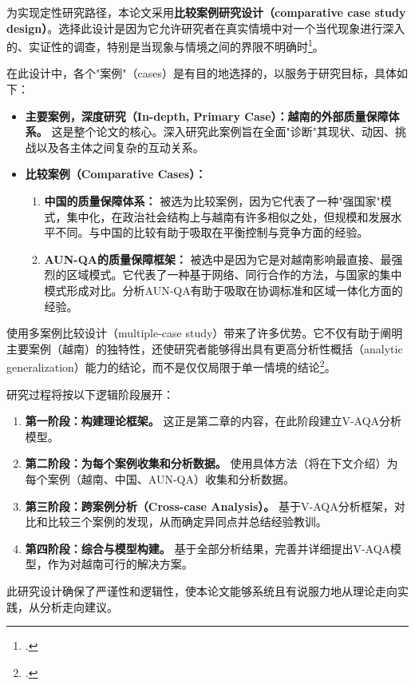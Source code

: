 为实现定性研究路径，本论文采用\textbf{比较案例研究设计（comparative case study design）}。选择此设计是因为它允许研究者在真实情境中对一个当代现象进行深入的、实证性的调查，特别是当现象与情境之间的界限不明确时\footcite{Yin2018}。

在此设计中，各个"案例"（cases）是有目的地选择的，以服务于研究目标，具体如下：
\begin{itemize}
    \item \textbf{主要案例，深度研究（In-depth, Primary Case）：越南的外部质量保障体系。} 这是整个论文的核心。深入研究此案例旨在全面"诊断"其现状、动因、挑战以及各主体之间复杂的互动关系。
    
    \item \textbf{比较案例（Comparative Cases）：}
    \begin{enumerate}
        \item \textbf{中国的质量保障体系：} 被选为比较案例，因为它代表了一种"强国家"模式，集中化，在政治社会结构上与越南有许多相似之处，但规模和发展水平不同。与中国的比较有助于吸取在平衡控制与竞争方面的经验。
        \item \textbf{AUN-QA的质量保障框架：} 被选中是因为它是对越南影响最直接、最强烈的区域模式。它代表了一种基于网络、同行合作的方法，与国家的集中模式形成对比。分析AUN-QA有助于吸取在协调标准和区域一体化方面的经验。
    \end{enumerate}
\end{itemize}

使用多案例比较设计（multiple-case study）带来了许多优势。它不仅有助于阐明主要案例（越南）的独特性，还使研究者能够得出具有更高分析性概括（analytic generalization）能力的结论，而不是仅仅局限于单一情境的结论\footcite{Yin2018}。

研究过程将按以下逻辑阶段展开：
\begin{enumerate}
    \item \textbf{第一阶段：构建理论框架。} 这正是第二章的内容，在此阶段建立V-AQA分析模型。
    \item \textbf{第二阶段：为每个案例收集和分析数据。} 使用具体方法（将在下文介绍）为每个案例（越南、中国、AUN-QA）收集和分析数据。
    \item \textbf{第三阶段：跨案例分析（Cross-case Analysis）。} 基于V-AQA分析框架，对比和比较三个案例的发现，从而确定异同点并总结经验教训。
    \item \textbf{第四阶段：综合与模型构建。} 基于全部分析结果，完善并详细提出V-AQA模型，作为对越南可行的解决方案。
\end{enumerate}

此研究设计确保了严谨性和逻辑性，使本论文能够系统且有说服力地从理论走向实践，从分析走向建议。


